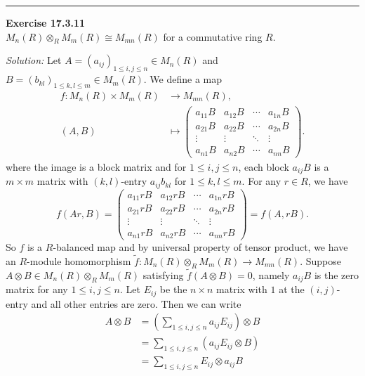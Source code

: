 \documentclass[a4paper, 12pt]{article}
\newenvironment{problem}[2][Exercise]
    { \begin{mdframed}[backgroundcolor=gray!20] \textbf{#1 #2} \\}
    {  \end{mdframed}}
\newenvironment{solution}
    {\textit{Solution:}}
    {}
\begin{document}
\noindent\rule{7in}{2.8pt}
\begin{problem}{17.3.11}
\(M_n(R)\otimes_R M_m(R)\cong M_{mn}(R)\) for a commutative ring \(R\).
\end{problem}
\begin{solution}
Let \(A=(a_{ij})_{1\leq i,j\leq n}\in M_n(R)\) and \(B=(b_{kl})_{1\leq k,l\leq m}\in M_m(R)\). We define a map 
\begin{align*}
	f:M_n(R)\times M_m(R)&\rightarrow M_{mn}(R),\\ 
	  (A,B)&\mapsto \begin{pmatrix}
		a_{11}B&a_{12}B&\cdots&a_{1n}B\\ 
		a_{21}B&a_{22}B&\cdots&a_{2n}B\\ 
		\vdots&\vdots&\ddots&\vdots\\ 
		a_{n1}B&a_{n2}B&\cdots&a_{nn}B
	  \end{pmatrix}.
\end{align*}
where the image is a block matrix and for \(1\leq i,j\leq n\), each block \(a_{ij}B\) is a \(m\times m\) matrix with \((k,l)\)-entry \(a_{ij}b_{kl}\) for \(1\leq k,l\leq m\). For any \(r\in R\), we have 
\[f(Ar,B)=\begin{pmatrix}
	a_{11}rB&a_{12}rB&\cdots&a_{1n}rB\\ 
	a_{21}rB&a_{22}rB&\cdots&a_{2n}rB\\ 
	\vdots&\vdots&\ddots&\vdots\\ 
	a_{n1}rB&a_{n2}rB&\cdots&a_{nn}rB
\end{pmatrix}=f(A,rB).\]
So \(f\) is a \(R\)-balanced map and by universal property of tensor product, we have an \(R\)-module homomorphism \(\tilde{f}:M_n(R)\otimes_R M_m(R)\rightarrow M_{mn}(R)\). Suppose \(A\otimes B\in M_n(R)\otimes_R M_m(R)\) satisfying \(\tilde{f}(A\otimes B)=0\), namely 
\(a_{ij}B\) is the zero matrix for any \(1\leq i,j\leq n\). Let \(E_{ij}\) be the \(n\times n\) matrix with \(1\) at the \((i,j)\)-entry and all other entries are zero. Then we can write 
\begin{align*}
A\otimes B&=(\sum_{1\leq i,j\leq n}a_{ij}E_{ij})\otimes B\\ 
          &=\sum_{1\leq i,j\leq n}(a_{ij}E_{ij}\otimes B)\\ 
		  &=\sum_{1\leq i,j\leq n}E_{ij}\otimes a_{ij}B\\ 

\end{align*}
\end{solution}
\end{document}
